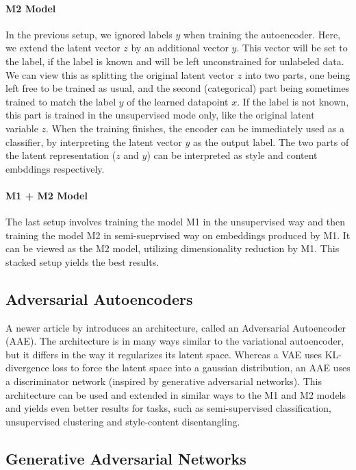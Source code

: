 \paragraph*{M2 Model}
In the previous setup, we ignored labels $y$ when training the autoencoder. Here, we extend the latent vector $z$ by an additional vector $y$. This vector will be set to the label, if the label is known and will be left unconstrained for unlabeled data. We can view this as splitting the original latent vector $z$ into two parts, one being left free to be trained as usual, and the second (categorical) part being sometimes trained to match the label $y$ of the learned datapoint $x$. If the label is not known, this part is trained in the unsupervised mode only, like the original latent variable $z$. When the training finishes, the encoder can be immediately used as a classifier, by interpreting the latent vector $y$ as the output label. The two parts of the latent representation ($z$ and $y$) can be interpreted as style and content embddings respectively.

\paragraph*{M1 + M2 Model}
The last setup involves training the model M1 in the unsupervised way and then training the model M2 in semi-sueprvised way on embeddings produced by M1. It can be viewed as the M2 model, utilizing dimensionality reduction by M1. This stacked setup yields the best results.


\subsection{Adversarial Autoencoders}

A newer article by \cite{AdversarialAutoencoders} introduces an architecture, called an Adversarial Autoencoder (AAE). The architecture is in many ways similar to the variational autoencoder, but it differs in the way it regularizes its latent space. Whereas a VAE uses KL-divergence loss to force the latent space into a gaussian distribution, an AAE uses a discriminator network (inspired by generative adversarial networks). This architecture can be used and extended in similar ways to the M1 and M2 models and yields even better results for tasks, such as semi-supervised classification, unsupervised clustering and style-content disentangling.


\subsection{Generative Adversarial Networks}

